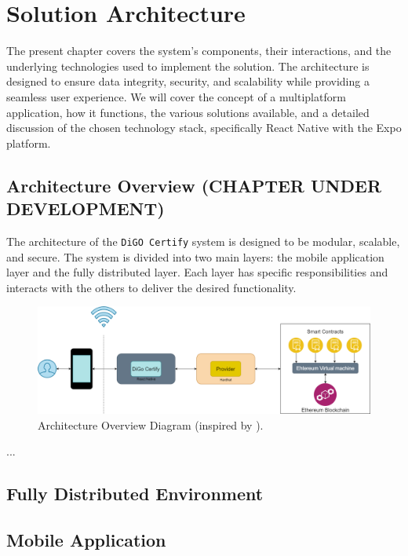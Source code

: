 %
%
\chapter{Solution Architecture}\label{chap:architecture}

The present chapter covers the system's components, their interactions, and the underlying technologies used to implement the solution. The architecture is designed to ensure data integrity, security, and scalability while providing a seamless user experience. We will cover the concept of a multiplatform application, how it functions, the various solutions available, and a detailed discussion of the chosen technology stack, specifically React Native with the Expo platform.

\section{Architecture Overview (CHAPTER UNDER DEVELOPMENT)}\label{sec:architecture-overview}

The architecture of the \texttt{DiGO Certify} system is designed to be modular, scalable, and secure. The system is divided into two main layers: the mobile application layer and the fully distributed layer. Each layer has specific responsibilities and interacts with the others to deliver the desired functionality.

\begin{figure}[H]
    \centering
    \includegraphics[width=1\textwidth]{assets/architecture-overview.drawio.png}
    \caption{Architecture Overview Diagram (inspired by \cite{geeksforgeeks-dApps}).}
    \label{fig:architecture-overview}
\end{figure}

...

\section{Fully Distributed Environment}\label{sec:fully-distributed-environment}

\section{Mobile Application}\label{sec:mobile-application}

